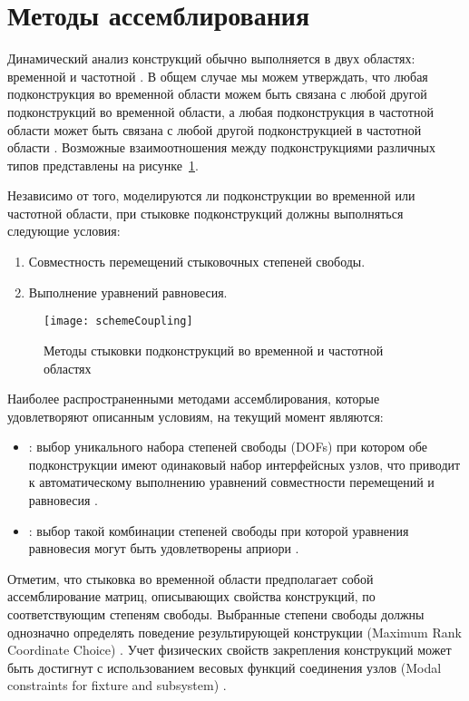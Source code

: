 \section{Методы ассемблирования}

Динамический анализ конструкций обычно выполняется в двух областях: временной \cite{lib:coupling:Dong&Shuo, lib:coupling:Gram-Schmidt} и частотной \cite{lib:coupling:Peeters}. В общем случае мы можем утверждать, что любая подконструкция во временной области можем быть связана с любой другой подконструкций во временной области, а любая подконструкция в частотной области может быть связана с любой другой подконструкцией в частотной области \cite{lib:coupling:Valk}. Возможные взаимоотношения между подконструкциями различных типов представлены на рисунке~\ref{fig:schemeCoupling}.

Независимо от того, моделируются ли подконструкции во временной или частотной области, при стыковке подконструкций должны выполняться следующие условия:
\begin{enumerate}[noitemsep]
	\item Совместность перемещений стыковочных степеней свободы.
	\item Выполнение уравнений равновесия. 
\end{enumerate}

\begin{figure}[!htb]
	\centering
	\texttt{[image: schemeCoupling]}
	\caption{Методы стыковки подконструкций во временной и частотной областях} \label{fig:schemeCoupling}
\end{figure}

Наиболее распространенными методами ассемблирования, которые удовлетворяют описанным условиям, на текущий момент являются:
\begin{itemize}
	\item {}: выбор уникального набора степеней свободы (DOFs) при котором обе подконструкции имеют одинаковый набор интерфейсных узлов, что приводит к автоматическому выполнению уравнений совместности перемещений и равновесия \cite{lib:coupling:Fregolent}.
	\item {}: выбор такой комбинации степеней свободы при которой уравнения равновесия  могут быть удовлетворены априори \cite{lib:coupling:DAmbrogio}.
\end{itemize}

Отметим, что стыковка во временной области предполагает собой ассемблирование матриц, описывающих свойства конструкций, по соответствующим степеням свободы. Выбранные степени свободы должны однозначно определять поведение результирующей конструкции (Maximum Rank Coordinate Choice) \cite{lib:coupling:Allen&Mayes}. Учет физических свойств закрепления конструкций может быть достигнут с использованием весовых функций соединения узлов (Modal constraints for fixture and subsystem) \cite{lib:coupling:Allen}. 

